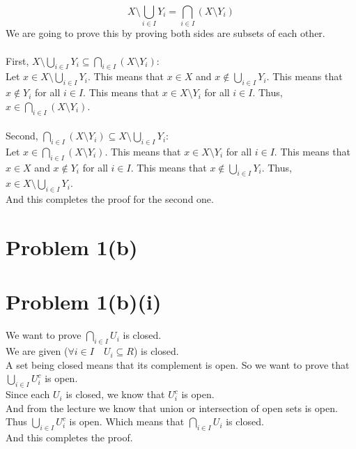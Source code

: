 \documentclass{article}
\begin{document}
\[
   X \setminus \bigcup_{i \in I} Y_i = \bigcap_{i \in I} (X \setminus Y_i)
\]
We are going to prove this by proving both sides are subsets of each other.\\
\\
First, \(X \setminus \bigcup_{i \in I} Y_i \subseteq \bigcap_{i \in I} (X \setminus Y_i)\): \\
Let \(x \in X \setminus \bigcup_{i \in I} Y_i\). This means that \(x \in X\) and \(x \notin \bigcup_{i \in I} Y_i\). This means that \(x \notin Y_i\) for all \(i \in I\). This means that \(x \in X \setminus Y_i\) for all \(i \in I\). Thus, \(x \in \bigcap_{i \in I} (X \setminus Y_i)\).\\
\\
Second, \(\bigcap_{i \in I} (X \setminus Y_i) \subseteq X \setminus \bigcup_{i \in I} Y_i\): \\
Let \(x \in \bigcap_{i \in I} (X \setminus Y_i)\). This means that \(x \in X \setminus Y_i\) for all \(i \in I\). This means that \(x \in X\) and \(x \notin Y_i\) for all \(i \in I\). This means that \(x \notin \bigcup_{i \in I} Y_i\). Thus, \(x \in X \setminus \bigcup_{i \in I} Y_i\).\\
And this completes the proof for the second one.\\

\section*{Problem 1(b)}
\section*{Problem 1(b)(i)}
We want to prove \(\bigcap_{i \in I} U_i\) is closed.\\
We are given (\(\forall i \in I \quad U_i \subseteq R\)) is closed. \\
A set being closed means that its complement is open. So we want to prove that \(\bigcup_{i \in I} U_i^c\) is open.\\
Since each \(U_i\) is closed, we know that \(U_i^c\) is open.\\
And from the lecture we know that union or intersection of open sets is open. Thus \(\bigcup_{i \in I} U_i^c\) is open. Which means that \(\bigcap_{i \in I} U_i\) is closed.\\
And this completes the proof.\\
\end{document}
